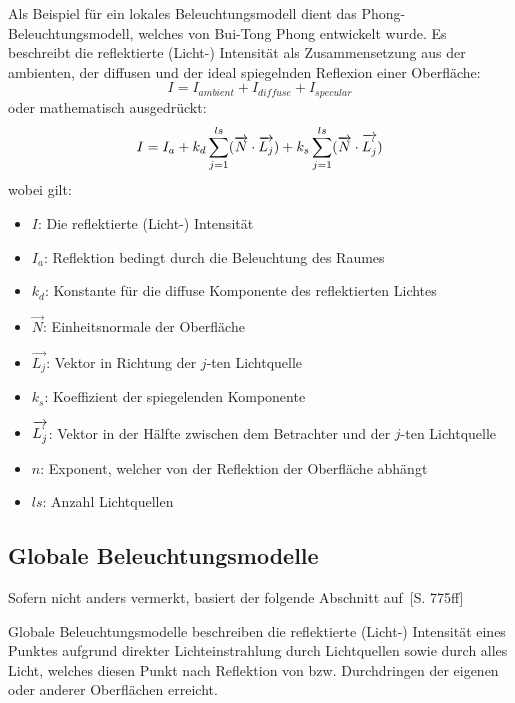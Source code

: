 Als Beispiel für ein lokales Beleuchtungsmodell dient das Phong-Beleuchtungsmodell, welches von Bui-Tong Phong entwickelt wurde.
Es beschreibt die reflektierte (Licht-) Intensität als Zusammensetzung aus der ambienten, der diffusen und der ideal spiegelnden Reflexion einer Oberfläche:
\begin{equation}
    I = I_{ambient} + I_{diffuse} + I_{specular}
\end{equation}
oder mathematisch ausgedrückt:
\begin{equation}
    I = I_a + k_d \displaystyle\sum_{j=1}^{ls} (\overrightarrow{N} \cdot \overrightarrow{L_j}) + k_s \displaystyle\sum_{j=1}^{ls} (\overrightarrow{N} \cdot \overrightarrow{L_j^`} )
\end{equation}
wobei gilt:
\begin{itemize}
    \item $I$:                      Die reflektierte (Licht-) Intensität
    \item $I_a$:                    Reflektion bedingt durch die Beleuchtung des Raumes
    \item $k_d$:                    Konstante für die diffuse Komponente des reflektierten Lichtes
    \item $\overrightarrow{N}$:     Einheitsnormale der Oberfläche
    \item $\overrightarrow{L_j}$:   Vektor in Richtung der $j$-ten Lichtquelle
    \item $k_s$:                    Koeffizient der spiegelenden Komponente
    \item $\overrightarrow{L_j^`}$: Vektor in der Hälfte zwischen dem Betrachter und der $j$-ten Lichtquelle
    \item $n$:                      Exponent, welcher von der Reflektion der Oberfläche abhängt
    \item $ls$:                     Anzahl Lichtquellen
\end{itemize}

\subsection{Globale Beleuchtungsmodelle}
\label{subsec:global_illumination_models}

Sofern nicht anders vermerkt, basiert der folgende Abschnitt auf~\cite{foley_computer_1996}[S. 775ff]

Globale Beleuchtungsmodelle beschreiben die reflektierte (Licht-) Intensität eines Punktes aufgrund direkter Lichteinstrahlung durch Lichtquellen sowie durch alles Licht, welches diesen Punkt nach Reflektion von bzw. Durchdringen der eigenen oder anderer Oberflächen erreicht.


